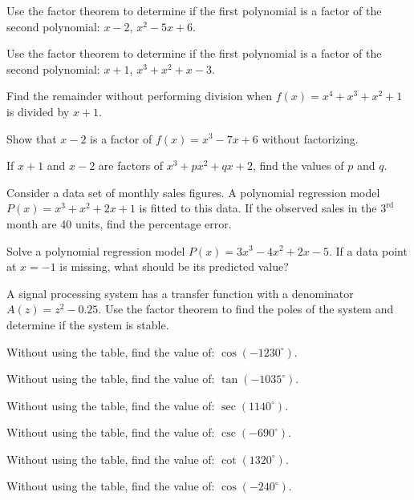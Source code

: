 \documentclass[11pt,a4paper]{article}
\begin{document}
\begin{shortlist}
\item Use the factor theorem to determine if the first polynomial is a factor of the second polynomial: $x-2$, $x^2-5x+6$.

\item Use the factor theorem to determine if the first polynomial is a factor of the second polynomial: $x+1$, $x^3+x^2+x-3$.

\item Find the remainder without performing division when $f(x)=x^4+x^3+x^2+1$ is divided by $x+1$.

\item Show that $x-2$ is a factor of $f(x)=x^3-7x+6$ without factorizing.

\item If $x+1$ and $x-2$ are factors of $x^3+px^2+qx+2$, find the values of $p$ and $q$.

\item Consider a data set of monthly sales figures. A polynomial regression model $P(x)=x^3+x^2+2x+1$ is fitted to this data. If the observed sales in the $3^{\text{rd}}$ month are 40 units, find the percentage error.

\item Solve a polynomial regression model $P(x)=3x^3-4x^2+2x-5$. If a data point at $x=-1$ is missing, what should be its predicted value?

\item A signal processing system has a transfer function with a denominator $A(z)=z^2-0.25$. Use the factor theorem to find the poles of the system and determine if the system is stable.

\item Without using the table, find the value of: $\cos(-1230^\circ)$.

\item Without using the table, find the value of: $\tan(-1035^\circ)$.

\item Without using the table, find the value of: $\sec(1140^\circ)$.

\item Without using the table, find the value of: $\csc(-690^\circ)$.

\item Without using the table, find the value of: $\cot(1320^\circ)$.

\item Without using the table, find the value of: $\cos(-240^\circ)$.


\end{shortlist}
\end{document}

